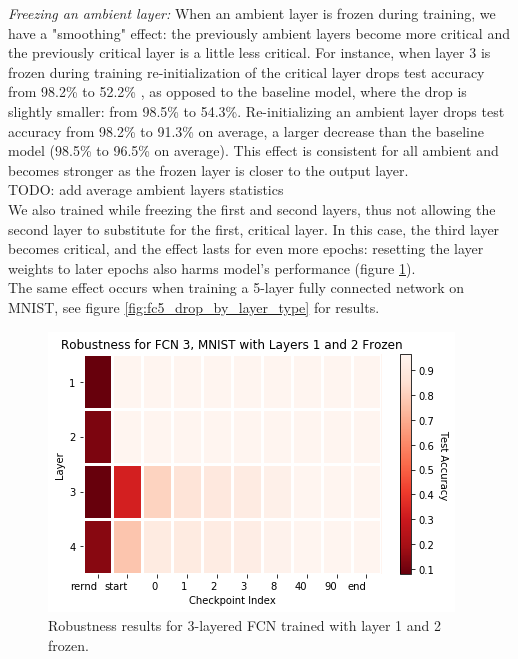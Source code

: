 \documentclass{article}
\begin{document}
\emph{Freezing an ambient layer:} When  an ambient layer is frozen during training, we have a "smoothing" effect: the previously ambient layers become more critical and the previously critical layer is a little less critical. For instance, when layer 3 is frozen during training re-initialization of the critical layer drops test accuracy from 98.2\% to 52.2\% , as opposed to the baseline model, where the drop is slightly smaller: from 98.5\% to 54.3\%. Re-initializing an ambient layer drops test accuracy from 98.2\% to 91.3\% on average, a larger decrease than the baseline model (98.5\% to 96.5\% on average). This effect is consistent for all ambient and becomes stronger as the frozen layer is closer to the output layer.\\    TODO: add average ambient layers statistics\\
We also trained while freezing the first and second layers, thus not allowing the second layer to substitute for the first, critical layer. In this case, the third layer becomes critical, and the effect lasts for even more epochs: resetting the layer weights to later epochs also harms model's performance (figure \ref{fig:f12_fc3_heatmap}).\\
The same effect occurs when training a 5-layer fully connected network on MNIST, see figure \ref{fig:fc5_drop_by_layer_type} for results. \\
\begin{figure}
  \includegraphics[width=\linewidth]{images/f12_fc3_mnist_heatmap.png}
  \caption{Robustness results for 3-layered FCN trained with layer 1 and 2 frozen.}
  \label{fig:f12_fc3_heatmap}
\end{figure}
\end{document}
